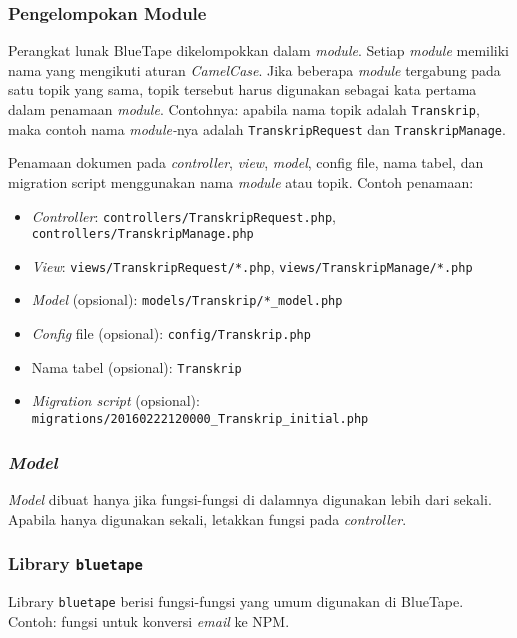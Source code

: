 	\subsubsection{Pengelompokan Module}
		Perangkat lunak BlueTape dikelompokkan dalam \textit{module}. Setiap \textit{module} memiliki nama yang mengikuti aturan \textit{CamelCase}. Jika beberapa \textit{module} tergabung pada satu topik yang sama, topik tersebut harus digunakan sebagai kata pertama dalam penamaan \textit{module}. Contohnya: apabila nama topik adalah \texttt{Transkrip}, maka contoh nama \textit{module-}nya adalah \texttt{TranskripRequest} dan \texttt{TranskripManage}.
		
		Penamaan dokumen pada \textit{controller}, \textit{view}, \textit{model}, config file, nama tabel, dan migration script menggunakan nama \textit{module} atau topik. Contoh penamaan:
		\begin{itemize}
			\item \textit{Controller}: \texttt{controllers/TranskripRequest.php}, \texttt{controllers/TranskripManage.php}
			\item \textit{View}: \texttt{views/TranskripRequest/*.php}, \texttt{views/TranskripManage/*.php}
			\item \textit{Model} (opsional): \texttt{models/Transkrip/*\_model.php}
			\item \textit{Config} file (opsional): \texttt{config/Transkrip.php}
			\item Nama tabel (opsional): \texttt{Transkrip}
			\item \textit{Migration script} (opsional): \texttt{migrations/20160222120000\_Transkrip\_initial.php}
		\end{itemize} 
	
	\subsubsection{\textit{Model}}
		\textit{Model} dibuat hanya jika fungsi-fungsi di dalamnya digunakan lebih dari sekali. Apabila hanya digunakan sekali, letakkan fungsi pada \textit{controller}.
	
	\subsubsection{Library \texttt{bluetape}}
		Library \texttt{bluetape} berisi fungsi-fungsi yang umum digunakan di BlueTape. Contoh: fungsi untuk konversi \textit{email} ke NPM.
	
